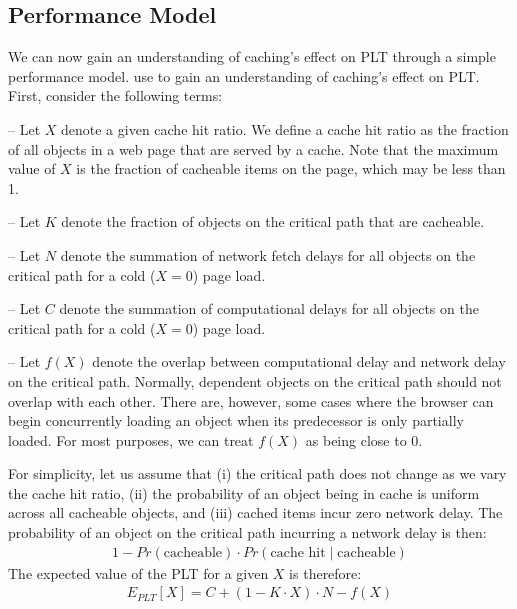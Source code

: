 \subsection{Performance Model}
\label{subsec:model}
We can now gain an understanding of caching's effect on PLT through a simple performance model.
use to gain an understanding of caching's effect on PLT.
First, consider the following terms:

\noindent-- Let $X$ denote a given cache hit ratio. We define a cache hit ratio as the fraction
of all objects in a web page that are served by a cache. Note that the maximum
value of $X$ is the fraction of cacheable items on the page, which may be less than 1.

\noindent-- Let $K$ denote the fraction of objects on the critical path that
are cacheable.

\noindent-- Let $N$ denote the summation of network fetch delays for all objects on the
critical path for a cold ($X=0$) page load.

\noindent-- Let $C$ denote the summation of computational delays for all
objects on the critical path for a cold ($X=0$) page load.

\noindent-- Let $f(X)$ denote the overlap between computational delay and
network delay on the critical path. Normally, dependent objects on the
critical path should not overlap with each other. There are, however, some cases where the browser can begin concurrently loading an object
when its predecessor is only partially loaded.
For most purposes, we can treat $f(X)$
as being close to 0.

For simplicity, let us assume that (i) the critical path does not change as we vary the cache hit
ratio, (ii) the probability of an object being in cache is uniform
across all cacheable objects, and (iii) cached items incur zero network delay. The probability of an object
on the critical path incurring a network delay is then:
\begin{align*}
1 - Pr(\text{cacheable}) \cdot Pr(\text{cache hit}\;|\;\text{cacheable})
\end{align*}
The expected value of the PLT for a given $X$ is therefore:
\begin{align*}
E_{PLT}[X] = C + (1 - K \cdot X) \cdot N - f(X)
\end{align*}

